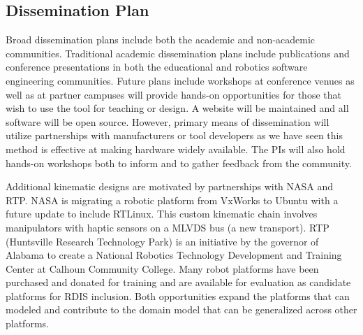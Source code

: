 \subsection{Dissemination Plan}
Broad dissemination plans include both the academic and non-academic communities.  Traditional academic dissemination plans include publications and conference presentations in both the educational and robotics software engineering communities.  Future plans include workshops at conference venues as well as at partner campuses will provide hands-on opportunities for those that wish to use the tool for teaching or design.  A website will be maintained and all software will be open source.  However, primary means of dissemination will utilize partnerships with manufacturers or tool developers as we have seen this method is effective at making hardware widely available.  The PIs will also hold hands-on workshops both to inform and to gather feedback from the community.  

Additional kinematic designs are motivated by partnerships with NASA and RTP.  NASA is migrating a robotic platform from VxWorks to Ubuntu with a future update to include RTLinux.  This custom kinematic chain involves manipulators with haptic sensors on a MLVDS bus (a new transport).  RTP (Huntsville Research Technology Park) is an initiative by the governor of Alabama to create a National Robotics Technology Development and Training Center at Calhoun Community College.  Many robot platforms have been purchased and donated for training and are available for evaluation as candidate platforms for RDIS inclusion.  Both opportunities expand the platforms that can modeled and contribute to the domain model that can be generalized across other platforms. 

